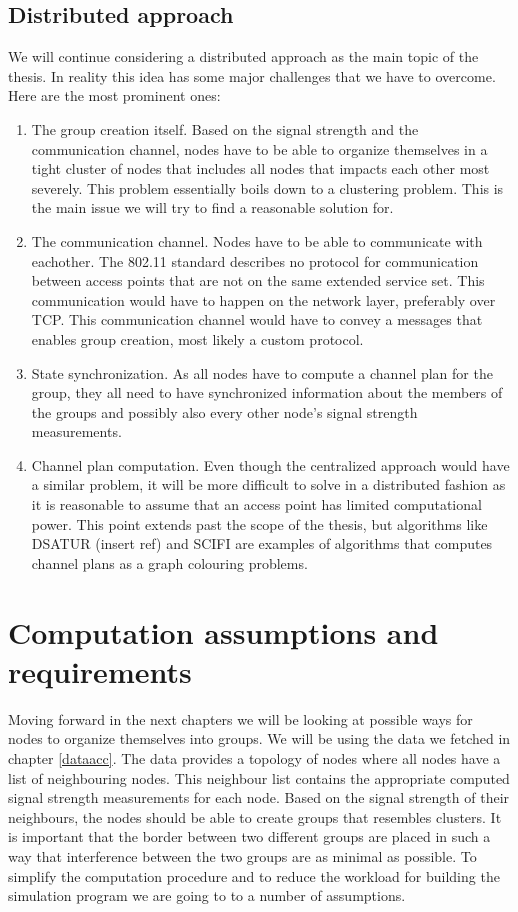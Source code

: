 \subsection{Distributed approach}
We will continue considering a distributed approach as the main topic of the thesis. In reality this idea has some major challenges that we have to overcome. Here are the most prominent ones: 
\begin{enumerate}
	\item The group creation itself. Based on the signal strength and the communication channel, nodes have to be able to organize themselves in a tight cluster of nodes that
		includes all nodes that impacts each other most severely. This problem essentially boils down to a clustering problem. This is the main issue we will
		try to find a reasonable solution for. 
	\item The communication channel. Nodes have to be able to communicate with eachother. The 802.11 standard describes no protocol for communication between access points that are not on the same extended service set. This communication would have to happen on the network layer, preferably over TCP. This communication channel would have to convey a messages that enables group creation,
		most likely a custom protocol. 	
	\item State synchronization. As all nodes have to compute a channel plan for the group, they all need to have synchronized information about the members of the groups
		and possibly also every other node's signal strength measurements. 
	\item Channel plan computation. Even though the centralized approach would have a similar problem, it will be more difficult to solve in a distributed fashion as 
		it is reasonable to assume that an access point has limited computational power. This point extends past the scope of the thesis, but algorithms like DSATUR {{(insert ref)}}
		and SCIFI are examples of algorithms that computes channel plans as a graph colouring problems.
\end{enumerate}

\section{Computation assumptions and requirements}
Moving forward in the next chapters we will be looking at possible ways for nodes to organize themselves into groups.
We will be using the data we fetched in chapter \ref{dataacc}. The data provides a topology of nodes where all nodes have a list of neighbouring nodes.
This neighbour list contains the appropriate computed signal strength measurements for each node. Based on the signal strength of their neighbours, the nodes should be able to create groups that resembles
clusters. It is important that the border between two different groups are placed in such a way that interference between the two groups are as minimal as possible. To simplify the computation procedure and to reduce the workload for building the simulation program we are going to to a number of assumptions. 

